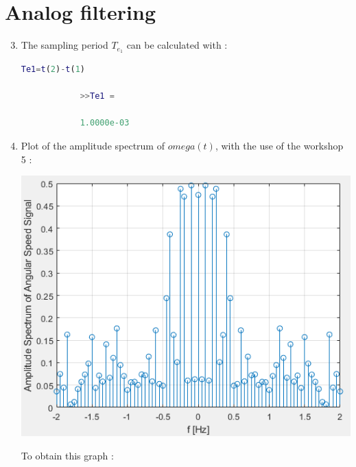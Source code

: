 \documentclass[a4paper,12pt]{article}
\begin{document}
\newpage
\section{Analog filtering}

\begin{enumerate}[label={\color{blue}\arabic*)}]
    \setcounter{enumi}{2}
    \item The sampling period \(T_{e_1}\) can be calculated with :

        \begin{lstlisting}[style=Matlab-editor,language=Matlab, basicstyle=\small\ttfamily]
            Te1=t(2)-t(1)

            >>Te1 =

            1.0000e-03

        \end{lstlisting}

    \item
    Plot of the amplitude spectrum of \(omega(t)\), with the use of the workshop 5 :

    \begin{multicols}{2}

        \begin{flushleft}
            \includegraphics[scale=0.5]{Images/DFT.png}
            \label{Figure2}
        \end{flushleft}

    \columnbreak

    To obtain this graph :


\end{multicols}
\end{enumerate}
\end{document}
